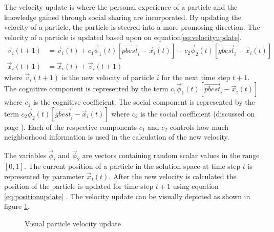 The velocity update is where the personal experience of a particle and the knowledge gained through social sharing are incorporated. By updating the velocity of a particle, the particle is steered into a more promosing direction. The velocity of a particle is updated based upon on equation\ref{eq:velocityupdate}.
\begin{align}
\vec{v}_i(t+1) &= \vec{v}_i(t) + c_1\vec{\phi}_1(t)[\vec{pbest}_i - \vec{x}_i(t)] + c_2\vec{\phi}_2(t)[\vec{gbest}_i - \vec{x}_i(t)]\label{eq:velocityupdate}\\
\vec{x}_i(t+1) &= \vec{x}_i(t) + \vec{v}_i(t+1)\label{eq:positionupdate}
\end{align}
where $\vec{v}_i(t+1)$ is the new velocity of particle $i$ for the next time step $t+1$. The cognitive component is represented by the term $c_1\vec{\phi}_1(t)[\vec{pbest}_i - \vec{x}_i(t)]$ where $c_1$ is the cognitive coefficient. The social component is represented by the term $c_2\vec{\phi}_2(t)[\vec{gbest}_i - \vec{x}_i(t)]$ where $c_2$ is the social coefficient (discussed on page \pageref{def:cognitivecomponent})\cite{FundamentalSwarm,CompuIntelligenceIntro}. Each of the respective components $c_1$ and $c_2$ controls how much neighborhood information is used in the calculation of the new velocity. 

The variables $\vec{\phi}_i$ and $\vec{\phi}_2$ are vectors containing random scalar values in the range $[0,1]$. The current position of a particle in the solution space at time step $t$ is represented by parameter $\vec{x}_i(t)$\cite{FundamentalSwarm,CompuIntelligenceIntro}. After the new velocity is calculated the position of the particle is updated for time step $t+1$ using equation \ref{eq:positionupdate} \cite{FundamentalSwarm,CompuIntelligenceIntro}. The velocity update can be visually depicted as shown in figure \ref{fig:particleVelocityUpdate}. 
\begin{figure}[H]
	\begin{center}
	\caption{Visual particle velocity update \cite{SOSwarm,FundamentalSwarm,CompuIntelligenceIntro,PSOSelfHierarch}}
	\label{fig:particleVelocityUpdate}
	\end{center}
\end{figure}


